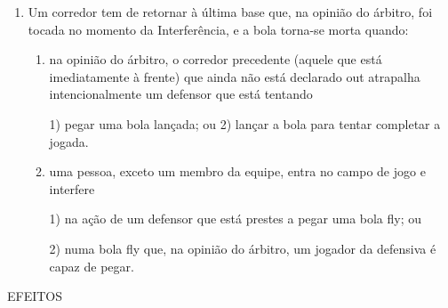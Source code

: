 \begin{enumerate}[label=(\alph*)]
\begin{enumerate}[label=\roman*.]
		\item   Um \gls{bunt}  executado depois do segundo \gls{strike} resulta em \gls{foulball}, exceto se um corredor atrapalha um defensor que está tentando pegar uma bola \gls{fly} resultante de \gls{bunt}  em território \gls{foul}, ou interfere numa bola \gls{foul fly} que um  defensor está tentando pegar; nesse caso, o batedor-corredor volta a bater, com um \gls{strike} adicional pela bola \gls{foul} se a contagem de bolas era menos de dois  \glspl{strike} quando ele bateu a bola. Se um \gls{fly} resultante de \gls{bunt}  for pego, a bola  continuará viva e em jogo.
	\end{enumerate}

	\item  Um corredor tem de retornar à última base que, na opinião do árbitro, foi tocada no momento da Interferência, e a bola torna-se morta quando:

	\begin{enumerate}[label=\roman*.]
		\item na opinião do árbitro, o corredor precedente (aquele que está imediatamente à frente) que ainda não está declarado \gls{out} atrapalha  intencionalmente um defensor que está tentando

		1) pegar uma bola lançada; ou
		2) lançar a bola para tentar completar a jogada.

		\item  uma pessoa, exceto um membro da equipe, entra no campo de jogo e interfere

		1) na ação de um defensor que está prestes a pegar uma bola \gls{fly}; ou

		2) numa bola \gls{fly} que, na opinião do árbitro, um jogador da defensiva é capaz de pegar.
	\end{enumerate}
\end{enumerate}

EFEITOS

